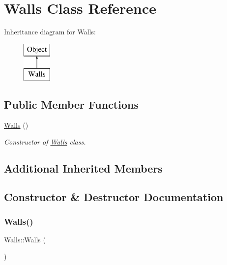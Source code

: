 \hypertarget{class_walls}{}\section{Walls Class Reference}
\label{class_walls}
Inheritance diagram for Walls\+:\begin{figure}[H]
\begin{center}
\leavevmode
\includegraphics[height=2.000000cm]{class_walls}
\end{center}
\end{figure}
\subsection*{Public Member Functions}
\begin{DoxyCompactItemize}
\item 
\hyperlink{class_walls_aa6927c56b93d24169a8909e73ba5c72f}{Walls} ()
\begin{DoxyCompactList}\small\item\em Constructor of \hyperlink{class_walls}{Walls} class. \end{DoxyCompactList}\end{DoxyCompactItemize}
\subsection*{Additional Inherited Members}


\subsection{Constructor \& Destructor Documentation}
\mbox{\label{class_walls_aa6927c56b93d24169a8909e73ba5c72f}} 
\subsubsection{\texorpdfstring{Walls()}{Walls()}}
{\footnotesize\ttfamily Walls\+::\+Walls (\begin{DoxyParamCaption}{ }\end{DoxyParamCaption})}



